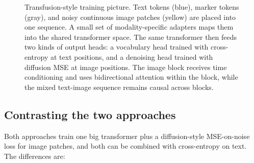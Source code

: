 \documentclass[usenames,dvipsnames]{article}
\newcommand{\myvecsym}[1]{\boldsymbol{#1}}
\newcommand{\vepsilon}{\myvecsym{\textcolor{CarnationPink}{\epsilon}}}
\begin{document}
\begin{figure}[H]
{%
}
\caption{Transfusion-style training picture. Text tokens (blue), marker tokens (gray), and noisy continuous image patches (yellow) are placed into one sequence. A small set of modality-specific adapters maps them into the shared transformer space. The same transformer then feeds two kinds of output heads: a vocabulary head trained with cross-entropy at text positions, and a denoising head trained with diffusion MSE at image positions. The image block receives time conditioning and uses bidirectional attention within the block, while the mixed text-image sequence remains causal across blocks.}
\label{fig:transfusion}
\end{figure}

\subsection{Contrasting the two approaches}

Both approaches train one big transformer plus a diffusion-style MSE-on-noise loss for image patches, and both can be combined with cross-entropy on text. The differences are:
\end{document}
